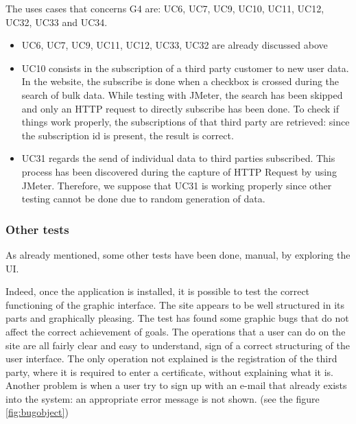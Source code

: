 The uses cases that concerns G4 are: UC6, UC7, UC9, UC10, UC11, UC12, UC32, UC33 and UC34. \\

\begin{itemize}
\item 
UC6, UC7, UC9, UC11, UC12, UC33, UC32 are already discussed above

\item 
UC10 consists in the subscription of a third party customer to new user data. \\
In the website, the subscribe is done when a checkbox is crossed during the search of bulk data. 
While testing with JMeter, the search has been skipped and only an HTTP request to directly subscribe has been done.
To check if things work properly, the subscriptions of that third party are retrieved: since the subscription id is present, the
result is correct.

\item 
UC31 regards the send of individual data to third parties subscribed. This process has been discovered during the capture of HTTP Request by using JMeter. Therefore, we suppose that UC31 is working properly since other testing cannot be done due to random generation of data.

\end{itemize}

\subsubsection{Other tests}
As already mentioned, some other tests have been done, manual, by exploring the UI. \\

\par
Indeed, once the application is installed, it is possible to test the correct functioning of the graphic interface. 
The site appears to be well structured in its parts and graphically pleasing. 
The test has found some graphic bugs that do not affect the correct achievement of goals. 
The operations that a user can do on the site are all fairly clear and easy to understand, sign of a correct structuring of the user
interface.
The only operation not explained is the registration of the third party, where it is required to enter a certificate, without explaining what
it is. Another problem is when a user try to sign up with an e-mail that already exists into the system: an appropriate error message is not shown. (see the figure \ref{fig:bugobject})\\

